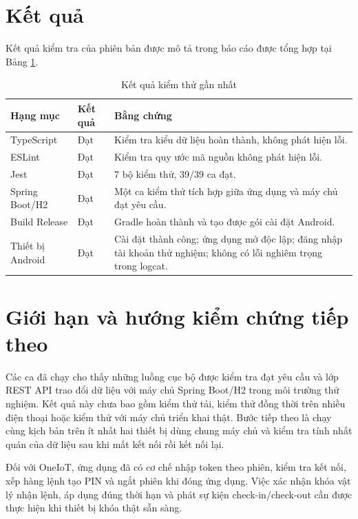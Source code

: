 \section{Kết quả}

Kết quả kiểm tra của phiên bản được mô tả trong báo cáo được tổng hợp tại Bảng \ref{tab:results}.

\begin{table}[H]
\centering
\caption{Kết quả kiểm thử gần nhất}
\label{tab:results}
\small
\begin{tabularx}{\textwidth}{>{\raggedright\arraybackslash}p{4.0cm}>{\centering\arraybackslash}p{2.2cm}X}
\toprule
\rowcolor{RoomHubLight}
\textbf{Hạng mục} & \textbf{Kết quả} & \textbf{Bằng chứng} \\
\midrule
TypeScript & Đạt & Kiểm tra kiểu dữ liệu hoàn thành, không phát hiện lỗi. \\
ESLint & Đạt & Kiểm tra quy ước mã nguồn không phát hiện lỗi. \\
Jest & Đạt & 7 bộ kiểm thử, 39/39 ca đạt. \\
Spring Boot/H2 & Đạt & Một ca kiểm thử tích hợp giữa ứng dụng và máy chủ đạt yêu cầu. \\
Build Release & Đạt & Gradle hoàn thành và tạo được gói cài đặt Android. \\
Thiết bị Android & Đạt & Cài đặt thành công; ứng dụng mở độc lập; đăng nhập tài khoản thử nghiệm; không có lỗi nghiêm trọng trong logcat. \\
\bottomrule
\end{tabularx}
\end{table}

\section{Giới hạn và hướng kiểm chứng tiếp theo}

Các ca đã chạy cho thấy những luồng cục bộ được kiểm tra đạt yêu cầu và lớp REST API trao đổi dữ liệu với máy chủ Spring Boot/H2 trong môi trường thử nghiệm. Kết quả này chưa bao gồm kiểm thử tải, kiểm thử đồng thời trên nhiều điện thoại hoặc kiểm thử với máy chủ triển khai thật. Bước tiếp theo là chạy cùng kịch bản trên ít nhất hai thiết bị dùng chung máy chủ và kiểm tra tính nhất quán của dữ liệu sau khi mất kết nối rồi kết nối lại.

Đối với OneIoT, ứng dụng đã có cơ chế nhập token theo phiên, kiểm tra kết nối, xếp hàng lệnh tạo PIN và ngắt phiên khi đóng ứng dụng. Việc xác nhận khóa vật lý nhận lệnh, áp dụng đúng thời hạn và phát sự kiện check-in/check-out cần được thực hiện khi thiết bị khóa thật sẵn sàng.
